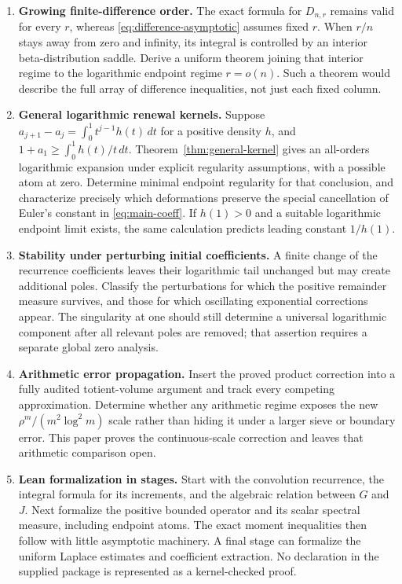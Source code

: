 \begin{enumerate}[leftmargin=*]
\item \textbf{Growing finite-difference order.}
The exact formula for $D_{n,r}$ remains valid for every $r$, whereas
\eqref{eq:difference-asymptotic} assumes fixed $r$. When $r/n$ stays
away from zero and infinity, its integral is controlled by an interior
beta-distribution saddle. Derive a uniform theorem joining that
interior regime to the logarithmic endpoint regime $r=o(n)$.
Such a theorem would describe the full array of difference inequalities,
not just each fixed column.

\item \textbf{General logarithmic renewal kernels.}
Suppose $a_{j+1}-a_j=\int_0^1t^{j-1}h(t)\,dt$ for a positive
density $h$, and $1+a_1\ge\int_0^1h(t)/t\,dt$.
Theorem~\ref{thm:general-kernel} gives an all-orders logarithmic
expansion under explicit regularity assumptions, with a possible atom
at zero. Determine minimal endpoint regularity for that conclusion,
and characterize precisely which deformations preserve the special
cancellation of Euler's constant in \eqref{eq:main-coeff}.
If $h(1)>0$ and a suitable logarithmic endpoint limit exists, the
same calculation predicts leading constant $1/h(1)$.

\item \textbf{Stability under perturbing initial coefficients.}
A finite change of the recurrence coefficients leaves their
logarithmic tail unchanged but may create additional poles.
Classify the perturbations for which the positive remainder measure
survives, and those for which oscillating exponential corrections
appear. The singularity at one should still determine a universal
logarithmic component after all relevant poles are removed; that
assertion requires a separate global zero analysis.

\item \textbf{Arithmetic error propagation.}
Insert the proved product correction into a fully audited
totient-volume argument and track every competing approximation.
Determine whether any arithmetic regime exposes the new
$\rho^m/(m^2\log^2m)$ scale rather than hiding it under a larger
sieve or boundary error. This paper proves the continuous-scale
correction and leaves that arithmetic comparison open.

\item \textbf{Lean formalization in stages.}
Start with the convolution recurrence, the integral formula for its
increments, and the algebraic relation between $G$ and $J$.
Next formalize the positive bounded operator and its scalar spectral
measure, including endpoint atoms. The exact moment inequalities
then follow with little asymptotic machinery. A final stage can
formalize the uniform Laplace estimates and coefficient extraction.
No declaration in the supplied package is represented as a
kernel-checked proof.
\end{enumerate}

